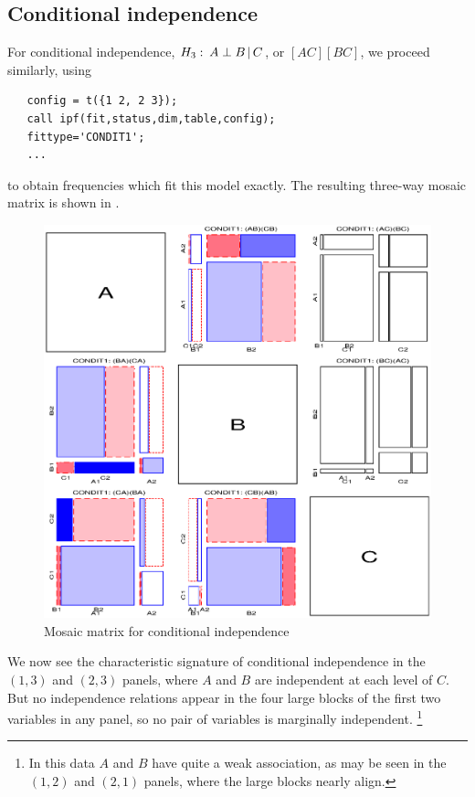 \subsection{Conditional independence}
For conditional independence, $H_3: \: A  \perp B \, | \, C$,
or $[A C][B C]$, we proceed similarly,  using
\begin{verbatim}
   config = t({1 2, 2 3});
   call ipf(fit,status,dim,table,config);
   fittype='CONDIT1';
   ...
\end{verbatim}
to obtain frequencies which fit this model exactly.
The resulting three-way mosaic matrix is shown in .
\begin{figure}[htb]
  \centering
  \includegraphics[scale=.6]{ch4/fig/mosfit-3}
  \caption[Mosaic matrix for conditional independence]{Mosaic matrix for conditional independence}%
  \label{fig:mosfit-3}
\end{figure}
We now see the characteristic signature of conditional independence in the
$(1, 3)$ and $(2, 3)$ panels, where $A$ and $B$ are independent at
each level of $C$. But no independence relations appear in the four
large blocks of the first two variables in any panel, so
no pair of variables is marginally independent.%
\footnote{In this data $A$ and $B$ have quite a weak association, as
may be seen in the $(1, 2)$ and $(2, 1)$ panels, where the large blocks
nearly align.}
